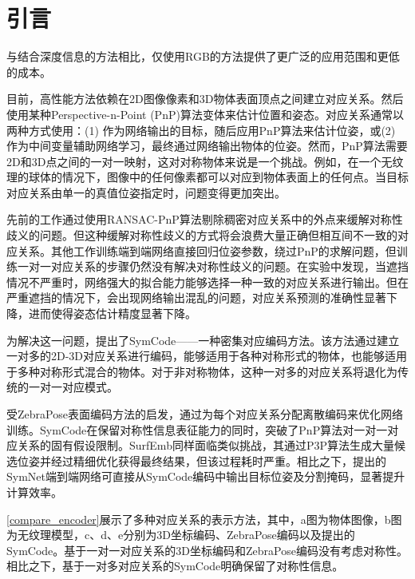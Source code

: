 \section{引言}
\par 与结合深度信息\cite{9191119, 9429889, 9933183, 9206072, 2024hipose}的方法相比，仅使用RGB的方法\cite{8765585, billings2019silhonet, hybridpose}提供了更广泛的应用范围和更低的成本。

目前，高性能方法\cite{wang2021gdr, su2022zebrapose}依赖在2D图像像素和3D物体表面顶点之间建立对应关系。然后使用某种Perspective-n-Point (PnP)算法\cite{EPnP}变体来估计位置和姿态。对应关系通常以两种方式使用：(1) 作为网络输出的目标\cite{su2022zebrapose}，随后应用PnP算法来估计位姿，或(2) 作为中间变量辅助网络学习，最终通过网络输出物体的位姿\cite{wang2021gdr}。然而，PnP算法需要2D和3D点之间的一对一映射，这对对称物体来说是一个挑战。例如，在一个无纹理的球体的情况下，图像中的任何像素都可以对应到物体表面上的任何点。当目标对应关系由单一的真值位姿指定时，问题变得更加突出。

先前的工作\cite{pvnet, park2019pix2pose, su2022zebrapose}通过使用RANSAC-PnP算法剔除稠密对应关系中的外点来缓解对称性歧义的问题。但这种缓解对称性歧义的方式将会浪费大量正确但相互间不一致的对应关系。其他工作\cite{wang2021gdr, Di_2021_ICCV}训练端到端网络直接回归位姿参数，绕过PnP的求解问题，但训练一对一对应关系的步骤仍然没有解决对称性歧义的问题。在实验中发现，当遮挡情况不严重时，网络强大的拟合能力能够选择一种一致的对应关系进行输出。但在严重遮挡的情况下，会出现网络输出混乱的问题，对应关系预测的准确性显著下降，进而使得姿态估计精度显著下降。

\par 为解决这一问题，提出了SymCode——一种密集对应编码方法。该方法通过建立一对多的2D-3D对应关系进行编码，能够适用于各种对称形式的物体，也能够适用于多种对称形式混合的物体。对于非对称物体，这种一对多的对应关系将退化为传统的一对一对应模式。

\par 受ZebraPose\cite{su2022zebrapose}表面编码方法的启发，通过为每个对应关系分配离散编码来优化网络训练。SymCode在保留对称性信息表征能力的同时，突破了PnP算法对一对一对应关系的固有假设限制。SurfEmb\cite{haugaard2022surfemb}同样面临类似挑战，其通过P3P算法生成大量候选位姿并经过精细优化获得最终结果，但该过程耗时严重。相比之下，提出的SymNet端到端网络可直接从SymCode编码中输出目标位姿及分割掩码，显著提升计算效率。

\par \autoref{compare_encoder}展示了多种对应关系的表示方法，其中，a图为物体图像，b图为无纹理模型，c、d、e分别为3D坐标编码、ZebraPose编码\cite{su2022zebrapose}以及提出的SymCode。基于一对一对应关系的3D坐标编码和ZebraPose编码没有考虑对称性。相比之下，基于一对多对应关系的SymCode明确保留了对称性信息。

